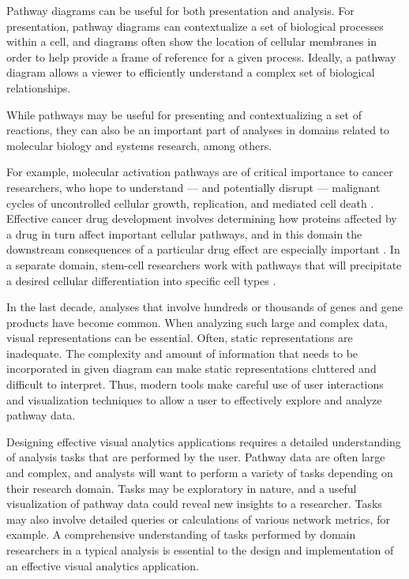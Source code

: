 \documentclass{egpubl}
\begin{document}

Pathway diagrams can be useful for both presentation and analysis.
For presentation, pathway diagrams can contextualize a set of biological processes within a cell, and diagrams often show the location of cellular membranes in order to help provide a frame of reference for a given process.
Ideally, a pathway diagram allows a viewer to efficiently understand a complex set of biological relationships.


While pathways may be useful for presenting and contextualizing a set of reactions, they can also be an important part of analyses in domains related to molecular biology and systems research, among others.

For example, molecular activation pathways are of critical importance to cancer researchers, who hope to understand --- and potentially disrupt --- malignant cycles of uncontrolled cellular growth, replication, and mediated cell death \cite{cairns2011regulation}.
Effective cancer drug development involves determining how proteins affected by a drug in turn affect important cellular pathways, and in this domain the downstream consequences of a particular drug effect are especially important \cite{luo2003targeting}.
In a separate domain, stem-cell researchers work with pathways that will precipitate a desired cellular differentiation into specific cell types \cite{reya2001stem}.


In the last decade, analyses that involve hundreds or thousands of genes and gene products have become common. When analyzing such large and complex data, visual representations can be essential.
Often, static representations are inadequate.
The complexity and amount of information that needs to be incorporated in given diagram can make static representations cluttered and difficult to interpret.
Thus, modern tools make careful use of user interactions and visualization techniques to allow a user to effectively explore and analyze pathway data.


Designing effective visual analytics applications requires a detailed understanding of analysis tasks that are performed by the user.
Pathway data are often large and complex, and analysts will want to perform a variety of tasks depending on their research domain.
Tasks may be exploratory in nature, and a useful visualization of pathway data could reveal new insights to a researcher.
Tasks may also involve detailed queries or calculations of various network metrics, for example.
A comprehensive understanding of tasks performed by domain researchers in a typical analysis is essential to the design and implementation of an effective visual analytics application.
\end{document}
